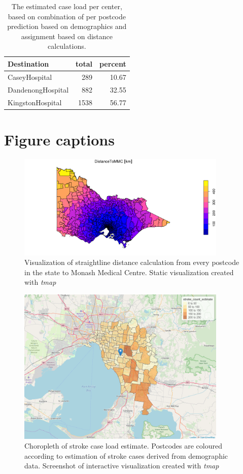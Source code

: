 \documentclass[utf8]{frontiersHLTH}
\begin{document}
\begin{table}
\begin{tabular}{l|r|r}
\hline
Destination & total & percent\\
\hline
CaseyHospital & 289 & 10.67\\
\hline
DandenongHospital & 882 & 32.55\\
\hline
KingstonHospital & 1538 & 56.77\\
\hline
\end{tabular}
\caption{The estimated case load per center, based on combination of per postcode prediction based on demographics and assignment based on distance calculations.\label{tab:rehabcaselaod}}
\end{table}

\section*{Figure captions}

\begin{figure}[h!]
\begin{center}
\includegraphics[width=10cm]{distance_mmc.png}
\end{center}
\caption{Visualization of straightline distance calculation from every postcode in the state to Monash Medical Centre. Static visualization created with {\em tmap}}\label{fig:DistanceToMMC}
\end{figure}

\begin{figure}[h!]
\begin{center}
\includegraphics[width=10cm]{choropleth.png}
\end{center}
\caption{Choropleth of stroke case load estimate. Postcodes are coloured according to estimation of stroke cases derived from demographic data. Screenshot of interactive visualization created with {\em tmap}}\label{fig:choropleth}
\end{figure}
\end{document}
